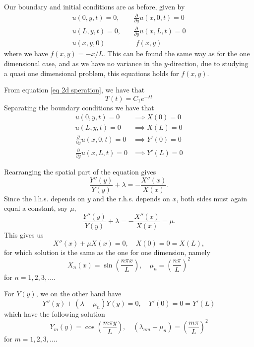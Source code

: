\documentclass[%
reprint,
nofootinbib,
amsmath,amssymb,
aps,
]{revtex4-1}
\newcommand{\fracpy}{\frac{\partial}{\partial y}}
\begin{document}
Our boundary and initial conditions are as before, given by 
\begin{equation}
	\begin{split}
		u(0,y,t) = 0, &\quad \fracpy u(x,0,t) = 0\\
		u(L,y,t) = 0, &\quad \fracpy u(x,L,t) = 0\\
		u(x,y,0) &= f(x,y)
	\end{split}
\end{equation}
where we have $f(x,y) = -x/L$. This can be found the same way as for the one dimensional case, and as we have no variance in the $y$-direction, due to studying a quasi one dimensional problem, this equations holds for $f(x,y)$.

From equation \eqref{eq 2d speration}, we have that 
\begin{equation}
	T(t) = C_1 e^{-\lambda t}
\end{equation}
Separating the boundary conditions we have that 
\begin{align*}
	u(0,y,t) = 0 &\implies X(0) = 0\\
	u(L,y,t) = 0 &\implies X(L) = 0\\
	\fracpy u(x,0,t) = 0 &\implies Y'(0) = 0\\
	\fracpy u(x,L,t) = 0 &\implies Y'(L) = 0
\end{align*}

Rearranging the spatial part of the equation gives 
\begin{equation}
	\frac{Y''(y)}{Y(y)} + \lambda = -\frac{X''(x)}{X(x)}.
\end{equation}
Since the l.h.s. depends on $y$ and the r.h.s. depends on $x$, both sides must again equal a constant, say $\mu$,
\begin{equation}
	\frac{Y''(y)}{Y(y)} + \lambda = -\frac{X''(x)}{X(x)} = \mu.
\end{equation}
This gives us 
\begin{equation}
	X''(x) + \mu X(x) = 0, \quad X(0) = 0 = X(L),
\end{equation}
for which solution is the same as the one for one dimension, namely 
\begin{equation}
	X_n(x) = \sin\left(\frac{n\pi x}{L}\right), \quad \mu_n = \left(\frac{n\pi}{L}\right)^2
\end{equation}
for $n=1,2,3,\dots$.

For $Y(y)$, we on the other hand have 
\begin{equation}
	Y''(y) + \left(\lambda - \mu_n\right)Y(y)=0, \quad Y'(0) = 0 = Y'(L)
\end{equation}
which have the following solution
\begin{equation}
	Y_m(y) = \cos\left(\frac{m\pi y}{L}\right), \quad \left(\lambda_{nm} - \mu_n\right) = \left(\frac{m\pi}{L}\right)^2
\end{equation}
for $m=1,2,3,\dots$. 
\end{document}
